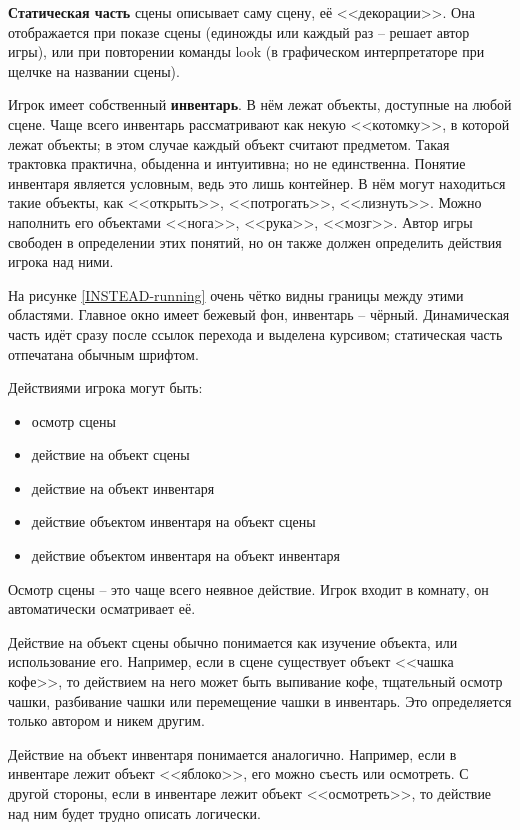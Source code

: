 \documentclass[12pt]{article}
\begin{document}
\textbf{Статическая часть} сцены описывает саму сцену, её <<декорации>>. Она отображается при показе сцены (единожды или каждый раз -- решает автор игры), или при повторении команды look (в графическом интерпретаторе при щелчке на названии сцены).

Игрок имеет собственный \textbf{инвентарь}. В нём лежат объекты, доступные на любой сцене. Чаще всего инвентарь рассматривают как некую <<котомку>>, в которой лежат объекты; в этом случае каждый объект считают предметом. Такая трактовка практична, обыденна и интуитивна; но не единственна. Понятие инвентаря является условным, ведь это лишь контейнер. В нём могут находиться такие объекты, как <<открыть>>, <<потрогать>>, <<лизнуть>>. Можно наполнить его объектами <<нога>>, <<рука>>, <<мозг>>. Автор игры свободен в определении этих понятий, но он также должен определить действия игрока над ними.

На рисунке \ref{INSTEAD-running} очень чётко видны границы между этими областями. Главное окно имеет бежевый фон, инвентарь -- чёрный. Динамическая часть идёт сразу после ссылок перехода и выделена курсивом; статическая часть отпечатана обычным шрифтом.

Действиями игрока могут быть:

\begin{itemize}
\item {осмотр сцены}
\item {действие на объект сцены}
\item {действие на объект инвентаря}
\item {действие объектом инвентаря на объект сцены}
\item {действие объектом инвентаря на объект инвентаря}
\end{itemize}

Осмотр сцены -- это чаще всего неявное действие. Игрок входит в комнату, он автоматически осматривает её.

Действие на объект сцены обычно понимается как изучение объекта, или использование его. Например, если в сцене существует объект <<чашка кофе>>, то действием на него может быть выпивание кофе, тщательный осмотр чашки, разбивание чашки или перемещение чашки в инвентарь. Это определяется только автором и никем другим.

Действие на объект инвентаря понимается аналогично. Например, если в инвентаре лежит объект <<яблоко>>, его можно съесть или осмотреть. С другой стороны, если в инвентаре лежит объект <<осмотреть>>, то действие над ним будет трудно описать логически.
\end{document}

